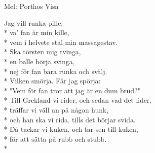 \begin{SongText}
    \begin{SongInfo}
        Mel: Porthos Visa
    \end{SongInfo}
    \begin{SongVerse}
        Jag vill runka pille,\\*%
        va’ fan är min kille,\\*%
        vem i helvete stal min massagestav.\\*%
        Ska törsten mig tvinga,\\*%
        en balle börja svinga,\\*%
        nej för fan bara runka och svälj.\\*%
        Vilken smörja. Får jag spörja:\\*%
        "Vem för fan tror att jag är en dum brud?"\\*%
        Till Grekland vi rider, och sedan vad det lider,\\*%
        träffar vi väll an på någon hunk,\\*%
        och han ska vi rida, tills det
        börjar svida.\\*%
        Då tackar vi kuken, och tar sen till kuken,\\*%
        för att sätta på rubb och stubb. \\*%
    \end{SongVerse}
\end{SongText}
